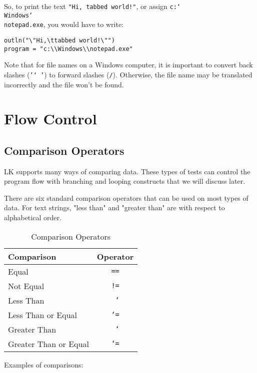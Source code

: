 \documentclass{article}
\newcommand\bslash{\char`\\}
\newcommand\lt{\char`\<}
\newcommand\gt{\char`\>}
\begin{document}
So, to print the text \texttt{"Hi,   tabbed world!"}, or assign \texttt{c:\bslash Windows\bslash notepad.exe}, you would have to write:

\begin{verbatim}
outln("\"Hi,\ttabbed world!\"")
program = "c:\\Windows\\notepad.exe"
\end{verbatim}

Note that for file names on a Windows computer, it is important to convert back slashes (\texttt{'\bslash'}) to forward slashes (\texttt{/}).  Otherwise, the file name may be translated incorrectly and the file won't be found.

\section{Flow Control}

\subsection{Comparison Operators}

LK supports many ways of comparing data.  These types of tests can control the program flow with branching and looping constructs that we will discuss later.

There are six standard comparison operators that can be used on most types of data.  For text strings, "less than" and "greater than" are with respect to alphabetical order.

\begin{table}[ht]
\begin{center}
\begin{tabular}{lc}
Comparison & Operator\\
\hline
Equal & \texttt{ == } \\
Not Equal & \texttt{ != }  \\
Less Than & \texttt{ \lt }  \\
Less Than or Equal & \texttt{ \lt= } \\
Greater Than & \texttt{ \gt } \\
Greater Than or Equal & \texttt{ \gt= } \\
\end{tabular}
\caption{Comparison Operators}
\label{tab_compop}
\end{center}
\end{table}

Examples of comparisons:
\end{document}
